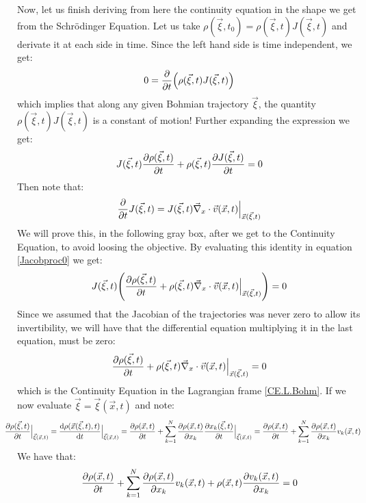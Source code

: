 \documentclass[11pt, a4paper]{article} %
\begin{document}
Now, let us finish deriving from here the continuity equation in the shape we get from the Schrödinger Equation. Let us take $\rho(\vec{\xi},t_0) = \rho(\vec{\xi},t) J(\vec{\xi},t)$ and derivate it at each side in time. Since the left hand side is time independent, we get:
\begin{equation}
0=\pdv{}{t}\qty( \rho(\vec{\xi},t) J(\vec{\xi},t))
\end{equation}
which implies that along any given Bohmian trajectory $\vec{\xi}$, the quantity $\rho(\vec{\xi},t) J(\vec{\xi},t)$ is a constant of motion! Further expanding the expression we get:
\begin{equation}\label{Jacobproc0}
J(\vec{\xi},t)\pdv{\rho(\vec{\xi},t)}{t}+\rho(\vec{\xi},t)\pdv{J(\vec{\xi},t)}{t}=0
\end{equation}
Then note that:
\begin{equation}\label{jainkoa}
\pdv{}{t}J(\vec{\xi},t)=J(\vec{\xi},t)\vec{\nabla}_x\cdot\vec{v}(\vec{x},t)\Big\rvert_{\vec{x}(\vec{\xi},t)}
\end{equation}
We will prove this, in the following gray box, after we get to the Continuity Equation, to avoid loosing the objective. By evaluating this identity in equation \eqref{Jacobproc0} we get:
\begin{equation}
J(\vec{\xi},t)\qty(\pdv{\rho(\vec{\xi},t)}{t}+\rho(\vec{\xi},t)\vec{\nabla}_x\cdot\vec{v}(\vec{x},t)\Big\rvert_{\vec{x}(\vec{\xi},t)})=0
\end{equation}
Since we assumed that the Jacobian of the trajectories was never zero to allow its invertibility, we will have that the differential equation multiplying it in the last equation, must be zero:
\begin{equation}
\pdv{\rho(\vec{\xi},t)}{t}+\rho(\vec{\xi},t)\vec{\nabla}_x\cdot\vec{v}(\vec{x},t)\Big\rvert_{\vec{x}(\vec{\xi},t)}=0
\end{equation}
which is the Continuity Equation in the Lagrangian frame \eqref{CE.L.Bohm}. If we now evaluate $\vec{\xi}=\vec{\xi}(\vec{x},t)$ and note:
\begin{equation}
\hspace*{-0.6cm}\pdv{\rho(\vec{\xi},t)}{t}\Big\rvert_{\vec{\xi}(\vec{x},t)}=\dv{\rho(\vec{x}(\vec{\xi},t),t)}{t}\Big\rvert_{\vec{\xi}(\vec{x},t)}=\pdv{\rho(\vec{x},t)}{t}+\sum_{k=1}^N\pdv{\rho(\vec{x},t)}{x_k}\pdv{x_k(\vec{\xi},t)}{t}\Big\rvert_{\vec{\xi}(\vec{x},t)}=\pdv{\rho(\vec{x},t)}{t}+\sum_{k=1}^N\pdv{\rho(\vec{x},t)}{x_k}v_k(\vec{x},t)
\end{equation}
We have that:
\begin{equation}
\pdv{\rho(\vec{x},t)}{t}+\sum_{k=1}^N\pdv{\rho(\vec{x},t)}{x_k}v_k(\vec{x},t)+\rho(\vec{x},t)\pdv{v_k(\vec{x},t)}{x_k}=0
\end{equation}
\end{document}
